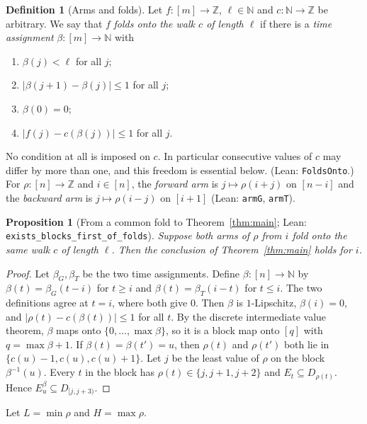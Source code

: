\documentclass[11pt]{article}
\newtheorem{proposition}[theorem]{Proposition}
\theoremstyle{definition}
\newtheorem{definition}[theorem]{Definition}
\theoremstyle{remark}
\newcommand{\Z}{\mathbb{Z}}
\newcommand{\N}{\mathbb{N}}
\newcommand{\lean}[1]{\texttt{#1}}
\begin{document}
\begin{definition}[Arms and folds]\label{def:fold}
Let $f:[m]\to\Z$, $\ell\in\N$ and $c:\N\to\Z$ be arbitrary. We say that $f$
\emph{folds onto the walk $c$ of length $\ell$} if there is a
\emph{time assignment} $\beta:[m]\to\N$ with
\begin{enumerate}[label=(F\arabic*)]
\item $\beta(j)<\ell$ for all $j$;
\item $|\beta(j+1)-\beta(j)|\le 1$ for all $j$;
\item $\beta(0)=0$;
\item $|f(j)-c(\beta(j))|\le1$ for all $j$.
\end{enumerate}
No condition at all is imposed on $c$. In particular consecutive values of $c$
may differ by more than one, and this freedom is essential below.
(Lean: \lean{FoldsOnto}.) For $\rho:[n]\to\Z$ and $i\in[n]$, the
\emph{forward arm} is $j\mapsto\rho(i+j)$ on $[n-i]$ and the
\emph{backward arm} is $j\mapsto\rho(i-j)$ on $[i+1]$ (Lean: \lean{armG},
\lean{armT}).
\end{definition}

\begin{proposition}[From a common fold to Theorem~\ref{thm:main};
Lean: \lean{exists\_blocks\_first\_of\_folds}]\label{prop:assembly}
Suppose both arms of $\rho$ from $i$ fold onto the same walk $c$ of length
$\ell$. Then the conclusion of Theorem~\ref{thm:main} holds for $i$.
\end{proposition}
\begin{proof}
Let $\beta_G,\beta_T$ be the two time assignments. Define $\beta:[n]\to\N$ by
$\beta(t)=\beta_G(t-i)$ for $t\ge i$ and $\beta(t)=\beta_T(i-t)$ for $t\le i$.
The two definitions agree at $t=i$, where both give $0$. Then $\beta$ is
$1$-Lipschitz, $\beta(i)=0$, and $|\rho(t)-c(\beta(t))|\le1$ for all $t$. By
the discrete intermediate value theorem, $\beta$ maps onto
$\{0,\dots,\max\beta\}$, so it is a block map onto $[q]$ with
$q=\max\beta+1$. If $\beta(t)=\beta(t')=u$, then $\rho(t)$ and $\rho(t')$ both
lie in $\{c(u)-1,c(u),c(u)+1\}$. Let $j$ be the least value of $\rho$ on the
block $\beta^{-1}(u)$. Every $t$ in the block has $\rho(t)\in\{j,j+1,j+2\}$ and
$E_t\subseteq D_{\rho(t)}$. Hence $E^\beta_u\subseteq D_{[j,j+3)}$.
\end{proof}

Let $L=\min\rho$ and $H=\max\rho$.
\end{document}
